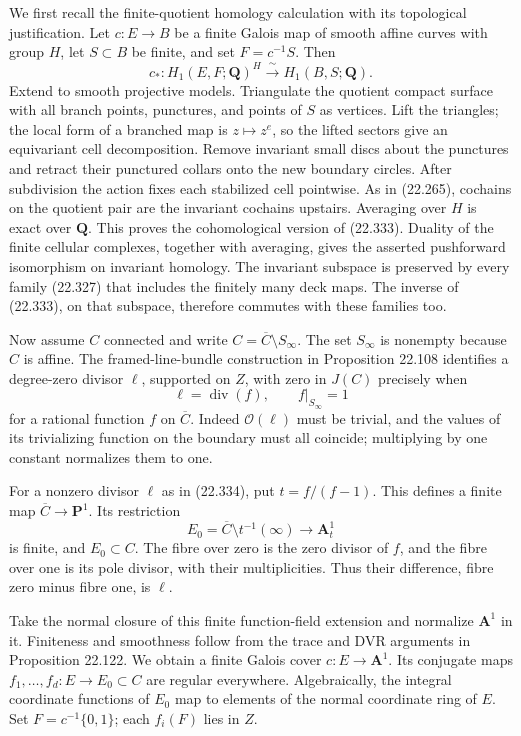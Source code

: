 \documentclass[
  11pt,
  a4paper,
]{article}
\newcounter{none} %
\begin{document}
We first recall the finite-quotient homology calculation with its
topological justification. Let \(c:E\to B\) be a finite Galois map of
smooth affine curves with group \(H\), let \(S\subset B\) be finite, and
set \(F=c^{-1}S\). Then \[
 c_*:H_1(E,F;\mathbf Q)^H
                  \xrightarrow{\ \sim\ }H_1(B,S;\mathbf Q).
 \tag{22.333}
\] Extend to smooth projective models. Triangulate the quotient compact
surface with all branch points, punctures, and points of \(S\) as
vertices. Lift the triangles; the local form of a branched map is
\(z\mapsto z^e\), so the lifted sectors give an equivariant cell
decomposition. Remove invariant small discs about the punctures and
retract their punctured collars onto the new boundary circles. After
subdivision the action fixes each stabilized cell pointwise. As in
(22.265), cochains on the quotient pair are the invariant cochains
upstairs. Averaging over \(H\) is exact over \(\mathbf Q\). This proves
the cohomological version of (22.333). Duality of the finite cellular
complexes, together with averaging, gives the asserted pushforward
isomorphism on invariant homology. The invariant subspace is preserved
by every family (22.327) that includes the finitely many deck maps. The
inverse of (22.333), on that subspace, therefore commutes with these
families too.

Now assume \(C\) connected and write
\(C=\overline C\setminus S_\infty\). The set \(S_\infty\) is nonempty
because \(C\) is affine. The framed-line-bundle construction in
Proposition 22.108 identifies a degree-zero divisor \(\ell\), supported
on \(Z\), with zero in \(J(C)\) precisely when \[
 \ell=\operatorname{div}(f),\qquad
 f|_{S_\infty}=1
 \tag{22.334}
\] for a rational function \(f\) on \(\overline C\). Indeed
\(\mathcal O(\ell)\) must be trivial, and the values of its trivializing
function on the boundary must all coincide; multiplying by one constant
normalizes them to one.

For a nonzero divisor \(\ell\) as in (22.334), put \(t=f/(f-1)\). This
defines a finite map \(\overline C\to\mathbf P^1\). Its restriction \[
 E_0=\overline C\setminus t^{-1}(\infty)
                 \longrightarrow\mathbf A^1_t
 \tag{22.335}
\] is finite, and \(E_0\subset C\). The fibre over zero is the zero
divisor of \(f\), and the fibre over one is its pole divisor, with their
multiplicities. Thus their difference, fibre zero minus fibre one, is
\(\ell\).

Take the normal closure of this finite function-field extension and
normalize \(\mathbf A^1\) in it. Finiteness and smoothness follow from
the trace and DVR arguments in Proposition 22.122. We obtain a finite
Galois cover \(c:E\to\mathbf A^1\). Its conjugate maps
\(f_1,\ldots,f_d:E\to E_0\subset C\) are regular everywhere.
Algebraically, the integral coordinate functions of \(E_0\) map to
elements of the normal coordinate ring of \(E\). Set
\(F=c^{-1}\{0,1\}\); each \(f_i(F)\) lies in \(Z\).
\end{document}
